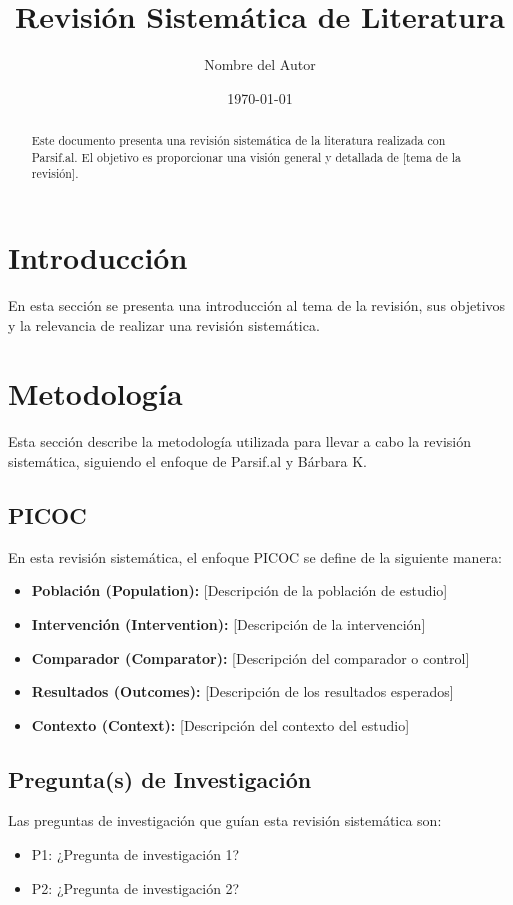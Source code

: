 \documentclass{article}
\title{Revisión Sistemática de Literatura}
\author{Nombre del Autor}
\date{\today}
\begin{document}
\maketitle

\begin{abstract}
    \noindent Este documento presenta una revisión sistemática de la literatura realizada con Parsif.al. El objetivo es proporcionar una visión general y detallada de [tema de la revisión].
\end{abstract}

\tableofcontents

\section{Introducción}
\noindent En esta sección se presenta una introducción al tema de la revisión, sus objetivos y la relevancia de realizar una revisión sistemática.

\section{Metodología}
\noindent Esta sección describe la metodología utilizada para llevar a cabo la revisión sistemática, siguiendo el enfoque de Parsif.al y Bárbara K.

\subsection{PICOC}
\noindent En esta revisión sistemática, el enfoque PICOC se define de la siguiente manera:

\begin{itemize}
    \item \textbf{Población (Population):} [Descripción de la población de estudio]
    \item \textbf{Intervención (Intervention):} [Descripción de la intervención]
    \item \textbf{Comparador (Comparator):} [Descripción del comparador o control]
    \item \textbf{Resultados (Outcomes):} [Descripción de los resultados esperados]
    \item \textbf{Contexto (Context):} [Descripción del contexto del estudio]
\end{itemize}

\subsection{Pregunta(s) de Investigación}
\noindent Las preguntas de investigación que guían esta revisión sistemática son:
\begin{itemize}
    \item P1: ¿Pregunta de investigación 1?
    \item P2: ¿Pregunta de investigación 2?
\end{itemize}
\end{document}
